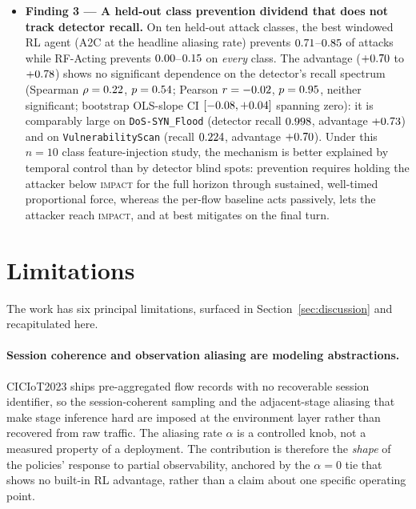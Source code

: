 \begin{itemize}
    \item \textbf{Finding 3 --- A held-out class prevention dividend that does not track detector recall.} On ten held-out attack classes, the best windowed RL agent (A2C at the headline aliasing rate) prevents $0.71$--$0.85$ of attacks while RF-Acting prevents $0.00$--$0.15$ on \emph{every} class. The advantage ($+0.70$ to $+0.78$) shows no significant dependence on the detector's recall spectrum (Spearman $\rho = 0.22$, $p = 0.54$; Pearson $r = -0.02$, $p = 0.95$, neither significant; bootstrap OLS-slope CI $[-0.08, +0.04]$ spanning zero): it is comparably large on \texttt{DoS-SYN\_Flood} (detector recall $0.998$, advantage $+0.73$) and on \texttt{VulnerabilityScan} (recall $0.224$, advantage $+0.70$). Under this $n=10$ class feature-injection study, the mechanism is better explained by temporal control than by detector blind spots: prevention requires holding the attacker below \textsc{impact} for the full horizon through sustained, well-timed proportional force, whereas the per-flow baseline acts passively, lets the attacker reach \textsc{impact}, and at best mitigates on the final turn.
\end{itemize}

\section{Limitations}\label{sec:limitations}
The work has six principal limitations, surfaced in Section~\ref{sec:discussion} and recapitulated here.

\paragraph{Session coherence and observation aliasing are modeling abstractions.} CICIoT2023 ships pre-aggregated flow records with no recoverable session identifier, so the session-coherent sampling and the adjacent-stage aliasing that make stage inference hard are imposed at the environment layer rather than recovered from raw traffic. The aliasing rate $\alpha$ is a controlled knob, not a measured property of a deployment. The contribution is therefore the \emph{shape} of the policies' response to partial observability, anchored by the $\alpha=0$ tie that shows no built-in RL advantage, rather than a claim about one specific operating point.

